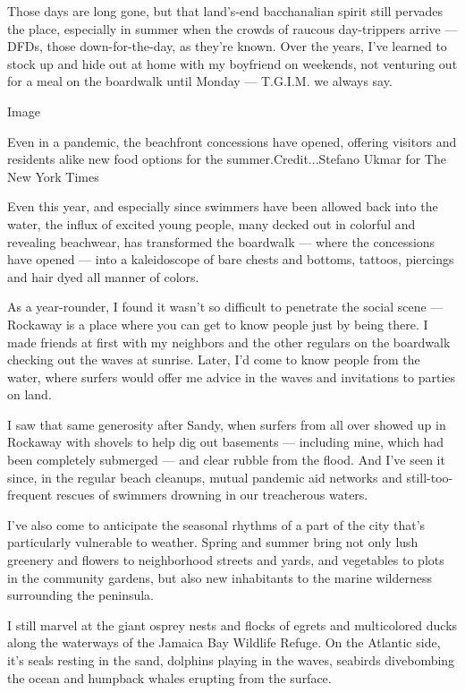 Those days are long gone, but that land's-end bacchanalian spirit still
pervades the place, especially in summer when the crowds of raucous
day-trippers arrive --- DFDs, those down-for-the-day, as they're known.
Over the years, I've learned to stock up and hide out at home with my
boyfriend on weekends, not venturing out for a meal on the boardwalk
until Monday --- T.G.I.M. we always say.

Image

Even in a pandemic, the beachfront concessions have opened, offering
visitors and residents alike new food options for the
summer.Credit...Stefano Ukmar for The New York Times

Even this year, and especially since swimmers have been allowed back
into the water, the influx of excited young people, many decked out in
colorful and revealing beachwear, has transformed the boardwalk ---
where the concessions have opened --- into a kaleidoscope of bare chests
and bottoms, tattoos, piercings and hair dyed all manner of colors.

As a year-rounder, I found it wasn't so difficult to penetrate the
social scene --- Rockaway is a place where you can get to know people
just by being there. I made friends at first with my neighbors and the
other regulars on the boardwalk checking out the waves at sunrise.
Later, I'd come to know people from the water, where surfers would offer
me advice in the waves and invitations to parties on land.

I saw that same generosity after Sandy, when surfers from all over
showed up in Rockaway with shovels to help dig out basements ---
including mine, which had been completely submerged --- and clear rubble
from the flood. And I've seen it since, in the regular beach cleanups,
mutual pandemic aid networks and still-too-frequent rescues of swimmers
drowning in our treacherous waters.

I've also come to anticipate the seasonal rhythms of a part of the city
that's particularly vulnerable to weather. Spring and summer bring not
only lush greenery and flowers to neighborhood streets and yards, and
vegetables to plots in the community gardens, but also new inhabitants
to the marine wilderness surrounding the peninsula.

I still marvel at the giant osprey nests and flocks of egrets and
multicolored ducks along the waterways of the Jamaica Bay Wildlife
Refuge. On the Atlantic side, it's seals resting in the sand, dolphins
playing in the waves, seabirds divebombing the ocean and humpback whales
erupting from the surface.

